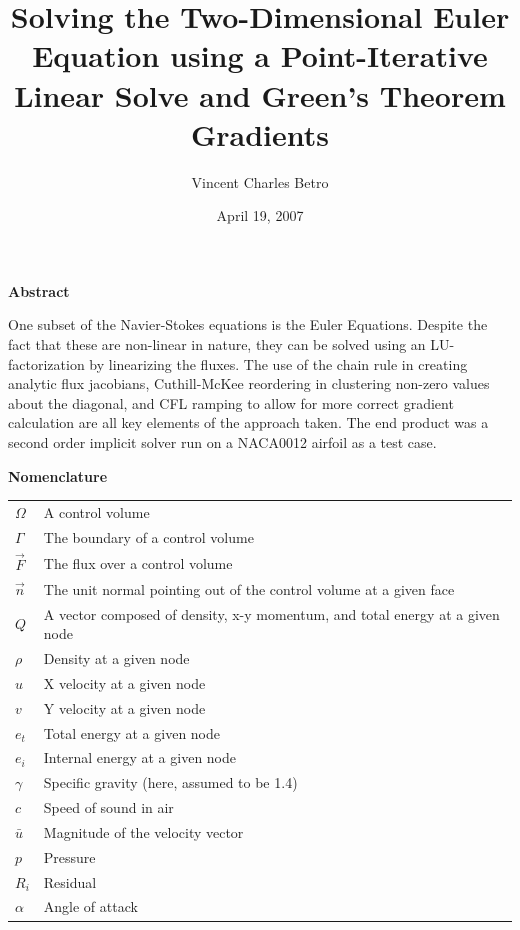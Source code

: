 \documentclass[letterpaper,twoside,11pt,openright,pdf]{book} %
\title{Solving the Two-Dimensional Euler Equation using a Point-Iterative Linear Solve and Green's Theorem Gradients}
\date{April 19, 2007}
\author{Vincent Charles Betro}
\begin{document}
\maketitle

\setcounter{page}{1}

\begin{center}
\textbf{Abstract}
\end{center}

One subset of the Navier-Stokes equations is the Euler Equations.  Despite the fact that these are non-linear in nature, they can be solved using an LU-factorization by linearizing the fluxes.  The use of the chain rule in creating analytic flux jacobians, Cuthill-McKee reordering in clustering non-zero values about the diagonal, and CFL ramping to allow for more correct gradient calculation are all key elements of the approach taken.  The end product was a second order implicit solver run on a NACA0012 airfoil as a test case.

\begin{center}
\textbf{Nomenclature}
\end{center}

\begin{center}
\begin{table}[htbp]
\centering
\begin{tabular}{ll}
\(\Omega\) & A control volume \\
\(\Gamma\) & The boundary of a control volume \\
\(\vec{F}\) & The flux over a control volume \\
\(\vec{n}\) & The unit normal pointing out of the control volume at a given face \\
\(Q\) & A vector composed of density, x-y momentum, and total energy at a given node \\
\(\rho\) & Density at a given node \\
\(u\) & X velocity at a given node \\
\(v\) & Y velocity at a given node \\
\(e_t\) & Total energy at a given node \\
\(e_i\) & Internal energy at a given node \\
\(\gamma\) & Specific gravity (here, assumed to be 1.4) \\
\(c\) & Speed of sound in air \\
\(\bar{u}\) & Magnitude of the velocity vector \\
\(p\) & Pressure \\
\(R_i\) & Residual \\
\(\alpha\) & Angle of attack \\
\end{tabular}
\end{table}
\end{center}
\end{document}
